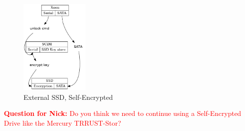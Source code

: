 \documentclass[12pt]{article}
\begin{document}
\begin{figure}[H]
\begin{center}
\includegraphics[width=0.3\textwidth]{img/ssd}
\caption{External SSD, Self-Encrypted}
\label{fig:ssd}
\end{center}
\end{figure}

\textcolor{red}{\textbf{Question for Nick:} Do you think we need to
continue using a Self-Encrypted Drive like the Mercury TRRUST-Stor?}

\end{document}
